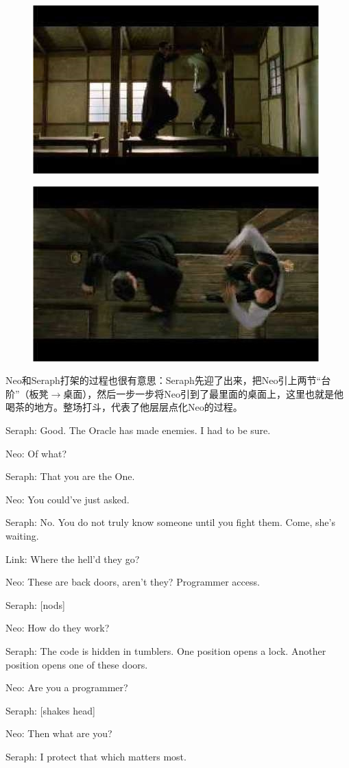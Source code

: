 \documentclass{ctexart}
\newenvironment{myquote}{\color{green} \setlength{\leftskip}{6em} \setlength{\rightskip}{4em} \setlength{\parindent}{-2em}}{\par}
\begin{document}
\begin{figure}[htb]
\centering
\includegraphics[width=0.5\linewidth]{fig/read_reloaded-60}
\end{figure}

\begin{figure}[htb]
\centering
\includegraphics[width=0.5\linewidth]{fig/read_reloaded-60-1}
\end{figure}

Neo和Seraph打架的过程也很有意思：Seraph先迎了出来，把Neo引上两节“台阶”（板凳$\rightarrow$桌面），然后一步一步将Neo引到了最里面的桌面上，这里也就是他喝茶的地方。整场打斗，代表了他层层点化Neo的过程。

\begin{myquote}
Seraph: Good. The Oracle has made enemies. I had to be sure.

Neo: Of what?

Seraph: That you are the One.

Neo: You could've just asked.

Seraph: No. You do not truly know someone until you fight them. Come, she's waiting.

Link: Where the hell'd they go?

Neo: These are back doors, aren't they? Programmer access.

Seraph: [nods]

Neo: How do they work?

Seraph: The code is hidden in tumblers. One position opens a lock. Another position opens one of these doors.

Neo: Are you a programmer?

Seraph: [shakes head]

Neo: Then what are you?

Seraph: I protect that which matters most.
\end{myquote}
\end{document}
